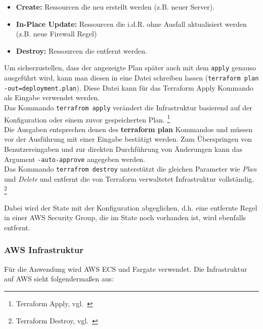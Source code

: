 \begin{itemize}
  \item \textbf{Create:} Ressourcen die neu erstellt werden (z.B. neuer Server).
  \item \textbf{In-Place Update:} Ressourcen die i.d.R. ohne Ausfall aktualisiert werden (z.B. neue Firewall Regel)
  \item \textbf{Destroy:} Ressourcen die entfernt werden.
\end{itemize}

Um sicherzustellen, dass der angezeigte Plan später auch mit dem \texttt{apply} genauso ausgeführt wird, kann man diesen in eine Datei schreiben lassen (\texttt{terraform plan -out=deployment.plan}).
Diese Datei kann für das Terraform Apply Kommando als Eingabe verwendet werden. \\

Das Kommando \texttt{terrafrom apply} verändert die Infrastruktur basierend auf der Konfiguration oder einem zuvor gespeicherten Plan.
\footnote{Terraform Apply, vgl.~\cite{TERRAFORM_APPLY}} \\

Die Ausgaben entsprechen denen des \textbf{terraform plan} Kommandos und müssen vor der Ausführung mit einer Eingabe bestätigt werden.
Zum Überspringen von Benutzereingaben und zur direkten Durchführung von Änderungen kann das Argument \texttt{-auto-approve} angegeben werden. \\

Das Kommando \texttt{terrafrom destroy} unterstützt die gleichen Parameter wie \textsl{Plan} und \textsl{Delete} und entfernt die von Terraform verwaltetet Infrastruktur vollständig.
\footnote{Terraform Destroy, vgl.~\cite{TERRAFORM_DESTROY}}

Dabei wird der State mit der Konfiguration abgeglichen, d.h. eine entfernte Regel in einer AWS Security Group, die im State noch vorhanden ist, wird ebenfalls entfernt.

\subsubsection{AWS Infrastruktur}

Für die Anwendung wird AWS ECS und Fargate verwendet.
Die Infrastruktur auf AWS sieht folgendermaßen aus:

